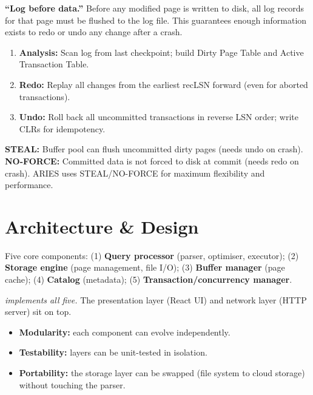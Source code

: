 \begin{interviewbox}
\textbf{``Log before data.''} Before any modified page is written to disk, all log records for that page must be flushed to the log file.  This guarantees enough information exists to redo or undo any change after a crash.
\end{interviewbox}

\begin{interviewbox}
\begin{enumerate}[nosep]
  \item \textbf{Analysis:} Scan log from last checkpoint; build Dirty Page Table and Active Transaction Table.
  \item \textbf{Redo:} Replay all changes from the earliest recLSN forward (even for aborted transactions).
  \item \textbf{Undo:} Roll back all uncommitted transactions in reverse LSN order; write CLRs for idempotency.
\end{enumerate}
\end{interviewbox}

\begin{interviewbox}
\textbf{STEAL:} Buffer pool can flush uncommitted dirty pages (needs undo on crash).  \textbf{NO-FORCE:} Committed data is not forced to disk at commit (needs redo on crash).  ARIES uses STEAL/NO-FORCE for maximum flexibility and performance.
\end{interviewbox}

\section{Architecture \& Design}

\begin{interviewbox}
Five core components: (1) \textbf{Query processor} (parser, optimiser, executor); (2) \textbf{Storage engine} (page management, file I/O); (3) \textbf{Buffer manager} (page cache); (4) \textbf{Catalog} (metadata); (5) \textbf{Transaction/concurrency manager}.

\emph{\shiftdb{} implements all five.}  The presentation layer (React UI) and network layer (HTTP server) sit on top.
\end{interviewbox}

\begin{interviewbox}
\begin{itemize}[nosep]
  \item \textbf{Modularity:} each component can evolve independently.
  \item \textbf{Testability:} layers can be unit-tested in isolation.
  \item \textbf{Portability:} the storage layer can be swapped (file system to cloud storage) without touching the parser.
\end{itemize}
\end{interviewbox}

